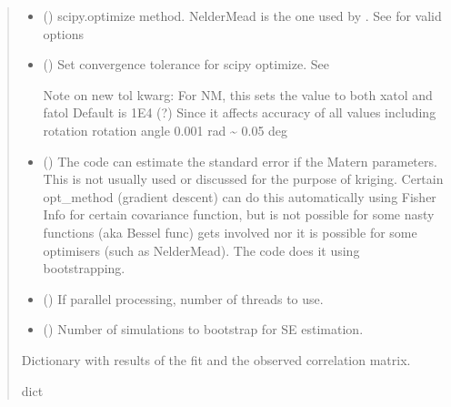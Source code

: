 \documentclass[letterpaper,10pt,english]{sphinxmanual}
\begin{document}
\begin{fulllineitems}
\begin{fulllineitems}
\begin{quote}
\begin{description}
\begin{itemize}
\item {}
\sphinxAtStartPar
{} () \textendash{} scipy.optimize method. Nelder\sphinxhyphen{}Mead is the one used by .
See 
for valid options

\item {}
\sphinxAtStartPar
{} () \textendash{}
\sphinxAtStartPar
Set convergence tolerance for scipy optimize.
See 

\sphinxAtStartPar
Note on new tol kwarg:
For N\sphinxhyphen{}M, this sets the value to both xatol and fatol
Default is 1E\sphinxhyphen{}4 (?)
Since it affects accuracy of all values including rotation
rotation angle 0.001 rad \textasciitilde{} 0.05 deg


\item {}
\sphinxAtStartPar
{} (\sphinxstyleliteralemphasis{\sphinxupquote{ | }}) \textendash{} The code can estimate the standard error if the Matern parameters.
This is not usually used or discussed for the purpose of kriging.
Certain opt\_method (gradient descent) can do this automatically
using Fisher Info for certain covariance function,
but is not possible for some nasty functions (aka Bessel
func) gets involved nor it is possible for some optimisers
(such as Nelder\sphinxhyphen{}Mead).
The code does it using bootstrapping.

\item {}
\sphinxAtStartPar
{} () \textendash{} If parallel processing, number of threads to use.

\item {}
\sphinxAtStartPar
{} () \textendash{} Number of simulations to bootstrap for SE estimation.

\end{itemize}

\sphinxAtStartPar
Dictionary with results of the fit and the observed correlation
matrix.

\sphinxAtStartPar
dict

\end{description}\end{quote}

\end{fulllineitems}


\end{fulllineitems}
\end{document}
